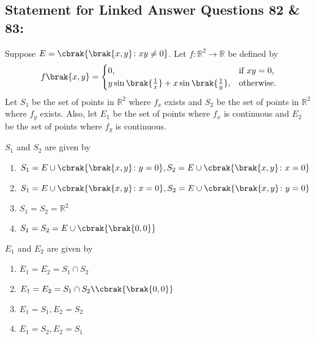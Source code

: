 \subsection*{Statement for Linked Answer Questions 82 \& 83:}
Suppose $E = \cbrak{\brak{x,y} \colon xy \neq 0}$. Let $f \colon \mathbb{R}^2 \rightarrow \mathbb{R}$ be defined by
\begin{align*}
    f\brak{x,y} =
    \begin{cases}
        0, & \text{if } xy = 0,\\
        y \sin{\brak{\frac{1}{x}}} + x \sin{\brak{\frac{1}{y}}}, & \text{otherwise.}
    \end{cases}
\end{align*}
Let $S_1$ be the set of points in $\mathbb{R}^2$ where $f_x$ exists and $S_2$ be the set of points in $\mathbb{R}^2$ where $f_y$ exists. Also, let $E_1$ be the set of points where $f_x$ is continuous and $E_2$ be the set of points where $f_y$ is continuous.
\item $S_1$ and $S_2$ are given by
\begin{enumerate}
    \item $S_1 = E \cup \cbrak{\brak{x,y}\colon y=0}, S_2 = E \cup \cbrak{\brak{x,y}\colon x=0}$
    \item $S_1 = E \cup \cbrak{\brak{x,y}\colon x=0}, S_2 = E \cup \cbrak{\brak{x,y}\colon y=0}$
    \item $S_1 = S_2 = \mathbb{R}^2$
    \item $S_1 = S_2 = E \cup \cbrak{\brak{0,0}}$
\end{enumerate}
\item $E_1$ and $E_2$ are given by
\begin{multicols}{2}
    \begin{enumerate}
        \item $E_1 = E_2 = S_1 \cap S_2$
        \item $E_1 = E_2 = S_1 \cap S_2 \verb|\| \cbrak{\brak{0,0}}$
        \item $E_1 = S_1, E_2 = S_2$
        \item $E_1 = S_2, E_2 = S_1$
    \end{enumerate}
\end{multicols}

